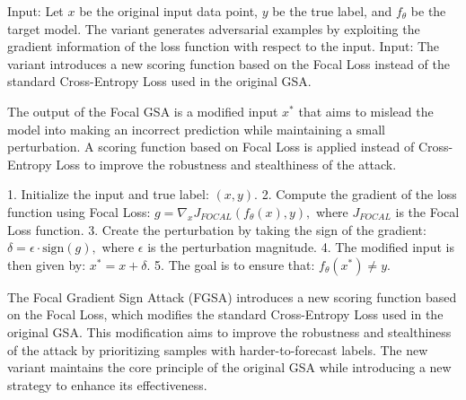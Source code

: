 Input: Let \( x \) be the original input data point, \( y \) be the true label, and \( f_{\theta} \) be the target model. The variant generates adversarial examples by exploiting the gradient information of the loss function with respect to the input.
Input: The variant introduces a new scoring function based on the Focal Loss instead of the standard Cross-Entropy Loss used in the original GSA.

The output of the Focal GSA is a modified input \( x^* \) that aims to mislead the model into making an incorrect prediction while maintaining a small perturbation. A scoring function based on Focal Loss is applied instead of Cross-Entropy Loss to improve the robustness and stealthiness of the attack.

1. Initialize the input and true label:
   $
   (x, y).
   $
2. Compute the gradient of the loss function using Focal Loss:
   $
   g = \nabla_x J_{FOCAL}(f_{\theta}(x), y),
   $
   where \( J_{FOCAL} \) is the Focal Loss function.
3. Create the perturbation by taking the sign of the gradient:
   $
   \delta = \epsilon \cdot \text{sign}(g),
   $
   where \( \epsilon \) is the perturbation magnitude.
4. The modified input is then given by:
   $
   x^* = x + \delta.
   $
5. The goal is to ensure that:
   $
   f_{\theta}(x^*) \neq y.
   $

The Focal Gradient Sign Attack (FGSA) introduces a new scoring function based on the Focal Loss, which modifies the standard Cross-Entropy Loss used in the original GSA. This modification aims to improve the robustness and stealthiness of the attack by prioritizing samples with harder-to-forecast labels. The new variant maintains the core principle of the original GSA while introducing a new strategy to enhance its effectiveness.